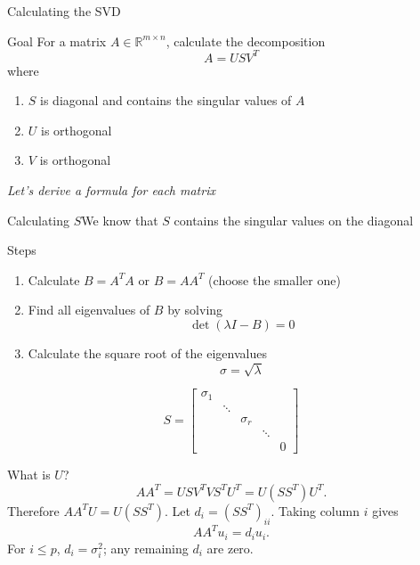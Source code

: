 \documentclass[10pt]{beamer}
\begin{document}
\begin{frame}{Calculating the SVD}

\begin{block}{Goal}
For a matrix $A \in \mathbb{R}^{m \times n}$, calculate the decomposition 
    $$A = U S V^T$$
where 
\begin{enumerate}
    \item $S$ is diagonal and contains the singular values of $A$
    \item $U$ is orthogonal 
    \item $V$ is orthogonal 
\end{enumerate}
\end{block}

\vspace{3mm}

\begin{center}
    \emph{Let's derive a formula for each matrix}
\end{center}
\end{frame}
\begin{frame}{Calculating $S$}{We know that $S$ contains the singular values on the diagonal}

\begin{block}{Steps}
    \begin{enumerate}
        \item Calculate $B = A^T A$ or $B = AA^T$ (choose the smaller one)
        \item Find all eigenvalues of $B$ by solving  
            $$ \det (\lambda I - B) = 0$$
        \item Calculate the square root of the eigenvalues 
            $$ \sigma = \sqrt{\lambda}$$
    \end{enumerate}
\end{block}
$$
S = \begin{bmatrix}
    \sigma_1 &        &          &        &\\
             & \ddots &          &        & \\
             &        & \sigma_r &        & \\
             &        &          & \ddots & \\
             &        &          &        & 0 
\end{bmatrix}
$$
\end{frame}

\begin{frame}{What is $U$?}
\[
AA^T=USV^TVS^TU^T=U(SS^T)U^T.
\]
Therefore $AA^TU=U(SS^T)$. Let $d_i=(SS^T)_{ii}$.
Taking column $i$ gives
\[
AA^Tu_i=d_i u_i.
\]
For $i\le p$, $d_i=\sigma_i^2$; any remaining $d_i$ are zero.
\end{frame}
\end{document}
